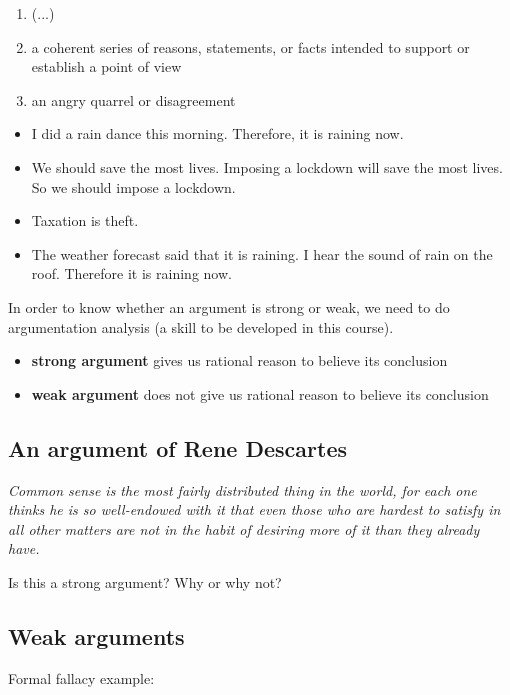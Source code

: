 \begin{enumerate}
    \item (...)
    \item a coherent series of reasons, statements, or facts intended to
        support or establish a point of view
    \item an angry quarrel or disagreement
\end{enumerate}

\begin{itemize}
    \item I did a rain dance this morning. Therefore, it is raining now.
    \item We should save the most lives. Imposing a lockdown will save the
        most lives. So we should impose a lockdown.
    \item Taxation is theft.
    \item The weather forecast said that it is raining. I hear the sound of
        rain on the roof. Therefore it is raining now.
\end{itemize}

In order to know whether an argument is strong or weak, we need to do
argumentation analysis (a skill to be developed in this course).

\begin{itemize}
    \item \textbf{strong argument} gives us rational reason to believe its
        conclusion
    \item \textbf{weak argument} does not give us rational reason to believe
        its conclusion
\end{itemize}

\subsection{An argument of Rene Descartes}

\textit{Common sense is the most fairly distributed thing in the world,
for each one thinks he is so well-endowed with it that even those who are
hardest to satisfy in all other matters are not in the habit of desiring
more of it than they already have.}

Is this a strong argument? Why or why not?

\subsection{Weak arguments}

Formal fallacy example:

